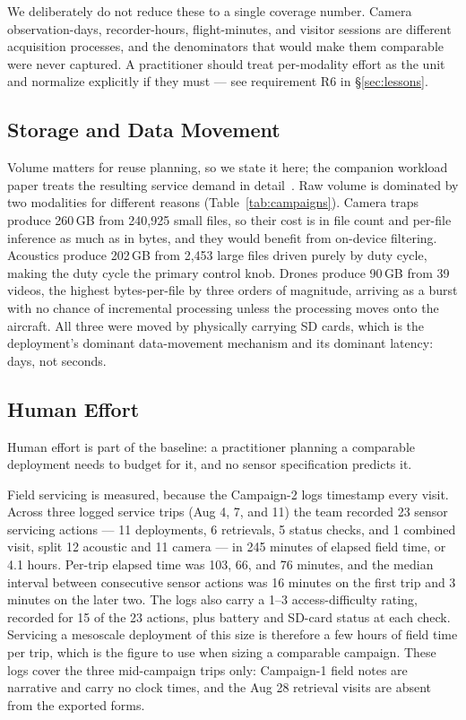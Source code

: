 \documentclass[sigconf]{acmart}
\begin{document}
We deliberately do not reduce these to a single coverage number. Camera
observation-days, recorder-hours, flight-minutes, and visitor sessions
are different acquisition processes, and the denominators that would
make them comparable were never captured. A practitioner should treat
per-modality effort as the unit and normalize explicitly if they must
--- see requirement R6 in \S\ref{sec:lessons}.

\subsection{Storage and Data Movement}

Volume matters for reuse planning, so we state it here; the companion
workload paper treats the resulting service demand in
detail~\cite{smartwilds_workload}. Raw volume is dominated by two
modalities for different reasons (Table~\ref{tab:campaigns}). Camera
traps produce 260\,GB from 240{,}925 small files, so their cost is in
file count and per-file inference as much as in bytes, and they would
benefit from on-device filtering. Acoustics produce 202\,GB from
2{,}453 large files driven purely by duty cycle, making the duty cycle
the primary control knob. Drones produce 90\,GB from 39 videos, the
highest bytes-per-file by three orders of magnitude, arriving as a burst
with no chance of incremental processing unless the processing moves onto
the aircraft. All three were moved by physically carrying SD cards,
which is the deployment's dominant data-movement mechanism and its
dominant latency: days, not seconds.

\subsection{Human Effort}
\label{sec:effort}

Human effort is part of the baseline: a practitioner planning a
comparable deployment needs to budget for it, and no sensor
specification predicts it.

Field servicing is measured, because the Campaign-2 logs timestamp every
visit. Across three logged service trips (Aug 4, 7, and 11) the team
recorded 23 sensor servicing actions --- 11 deployments, 6 retrievals,
5 status checks, and 1 combined visit, split 12 acoustic and 11 camera
--- in 245 minutes of elapsed field time, or 4.1 hours. Per-trip elapsed
time was 103, 66, and 76 minutes, and the median interval between
consecutive sensor actions was 16 minutes on the first trip and
3 minutes on the later two. The logs also carry a 1--3 access-difficulty
rating, recorded for 15 of the 23 actions, plus battery and SD-card
status at each check. Servicing a mesoscale deployment of this size is
therefore a few hours of field time per trip, which is the figure to use
when sizing a comparable campaign. These logs cover the three
mid-campaign trips only: Campaign-1 field notes are narrative and carry
no clock times, and the Aug 28 retrieval visits are absent from the
exported forms.
\end{document}
